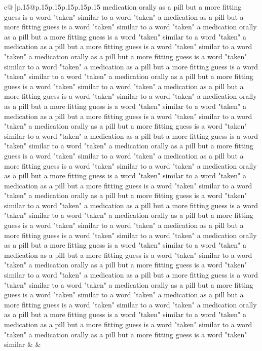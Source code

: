 \documentclass{article}
\begin{document}
{\begin{supertabular}{c@{$\;$}|p{.15\linewidth}@{}p{.15\linewidth}p{.15\linewidth}p{.15\linewidth}p{.15\linewidth}p{.15\linewidth}}
{{{medication orally as a pill but a more fitting guess is a word "taken" similar to a word "taken" a medication as a pill but a more fitting guess is a word "taken" similar to a word "taken" a medication orally as a pill but a more fitting guess is a word "taken" similar to a word "taken" a medication as a pill but a more fitting guess is a word "taken" similar to a word "taken" a medication orally as a pill but a more fitting guess is a word "taken" similar to a word "taken" a medication as a pill but a more fitting guess is a word "taken" similar to a word "taken" a medication orally as a pill but a more fitting guess is a word "taken" similar to a word "taken" a medication as a pill but a more fitting guess is a word "taken" similar to a word "taken" a medication orally as a pill but a more fitting guess is a word "taken" similar to a word "taken" a medication as a pill but a more fitting guess is a word "taken" similar to a word "taken" a medication orally as a pill but a more fitting guess is a word "taken" similar to a word "taken" a medication as a pill but a more fitting guess is a word "taken" similar to a word "taken" a medication orally as a pill but a more fitting guess is a word "taken" similar to a word "taken" a medication as a pill but a more fitting guess is a word "taken" similar to a word "taken" a medication orally as a pill but a more fitting guess is a word "taken" similar to a word "taken" a medication as a pill but a more fitting guess is a word "taken" similar to a word "taken" a medication orally as a pill but a more fitting guess is a word "taken" similar to a word "taken" a medication as a pill but a more fitting guess is a word "taken" similar to a word "taken" a medication orally as a pill but a more fitting guess is a word "taken" similar to a word "taken" a medication as a pill but a more fitting guess is a word "taken" similar to a word "taken" a medication orally as a pill but a more fitting guess is a word "taken" similar to a word "taken" a medication as a pill but a more fitting guess is a word "taken" similar to a word "taken" a medication orally as a pill but a more fitting guess is a word "taken" similar to a word "taken" a medication as a pill but a more fitting guess is a word "taken" similar to a word "taken" a medication orally as a pill but a more fitting guess is a word "taken" similar to a word "taken" a medication as a pill but a more fitting guess is a word "taken" similar to a word "taken" a medication orally as a pill but a more fitting guess is a word "taken" similar to a word "taken" a medication as a pill but a more fitting guess is a word "taken" similar to a word "taken" a medication orally as a pill but a more fitting guess is a word "taken" similar 
	  } 
	   } 
	   } 
	 & & \\ 
 


\end{supertabular}}
\end{document}
